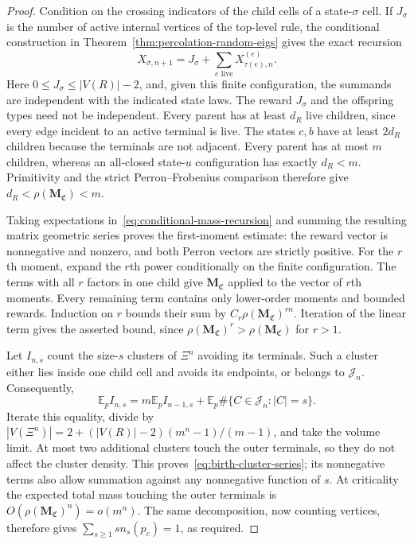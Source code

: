 \documentclass[scheme=plain,11pt]{ctexart}
\theoremstyle{definition}
\theoremstyle{remark}
\begin{document}
\begin{proof}
Condition on the crossing indicators of the child cells of a state-$\sigma$ cell.
If $J_\sigma$ is the number of active internal vertices of the top-level rule, the conditional construction in Theorem~\ref{thm:percolation-random-eigs} gives the exact recursion
\begin{equation}\label{eq:conditional-mass-recursion}
 X_{\sigma,n+1}=J_\sigma+
 \sum_{e\text{ live}}X_{\tau(e),n}^{(e)}.
\end{equation}
Here $0\le J_\sigma\le |V(R)|-2$, and, given this finite configuration, the summands are independent with the indicated state laws.
The reward $J_\sigma$ and the offspring types need not be independent.
Every parent has at least $d_R$ live children, since every edge incident to an active terminal is live.
The states $c,b$ have at least $2d_R$ children because the terminals are not adjacent.
Every parent has at most $m$ children, whereas an all-closed state-$u$ configuration has exactly $d_R<m$.
Primitivity and the strict Perron--Frobenius comparison therefore give $d_R<\rho(\mathbf M_{\mathfrak C})<m$.

Taking expectations in~\eqref{eq:conditional-mass-recursion} and summing the resulting matrix geometric series proves the first-moment estimate: the reward vector is nonnegative and nonzero, and both Perron vectors are strictly positive.
For the $r$th moment, expand the $r$th power conditionally on the finite configuration.
The terms with all $r$ factors in one child give $\mathbf M_{\mathfrak C}$ applied to the vector of $r$th moments.
Every remaining term contains only lower-order moments and bounded rewards.
Induction on $r$ bounds their sum by $C_r\rho(\mathbf M_{\mathfrak C})^{rn}$.
Iteration of the linear term gives the asserted bound, since $\rho(\mathbf M_{\mathfrak C})^r>\rho(\mathbf M_{\mathfrak C})$ for $r>1$.

Let $I_{n,s}$ count the size-$s$ clusters of $\Xi^n$ avoiding its terminals.
Such a cluster either lies inside one child cell and avoids its endpoints, or belongs to $\mathcal J_n$.
Consequently,
\[
 \mathbb E_p I_{n,s}=m\mathbb E_p I_{n-1,s}
 +\mathbb E_p\#\{C\in\mathcal J_n:|C|=s\}.
\]
Iterate this equality, divide by
$|V(\Xi^n)|=2+(|V(R)|-2)(m^n-1)/(m-1)$, and take the volume limit.
At most two additional clusters touch the outer terminals, so they do not affect the cluster density.
This proves~\eqref{eq:birth-cluster-series}; its nonnegative terms also allow summation against any nonnegative function of $s$.
At criticality the expected total mass touching the outer terminals is $O(\rho(\mathbf M_{\mathfrak C})^n)=o(m^n)$.
The same decomposition, now counting vertices, therefore gives $\sum_{s\ge1}s n_s(p_c)=1$, as required.
\end{proof}
\end{document}
